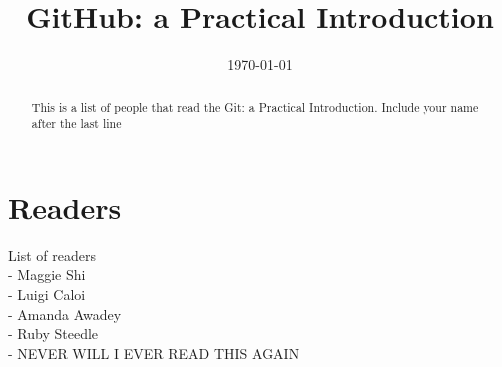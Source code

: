 \documentclass[12pt]{article}
\begin{document}
\title{GitHub: a Practical Introduction} 

\date{\today}

\maketitle 

\begin{abstract} 

	This is a list of people that read the Git: a Practical Introduction. Include your name after the last line
	
\end{abstract}

\section{Readers}
List of readers \\
- Maggie Shi \\
- Luigi Caloi  \\
- Amanda Awadey \\
- Ruby Steedle \\
- NEVER WILL I EVER READ THIS AGAIN \\
	 
\end{document}
